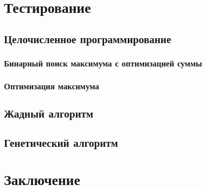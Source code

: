 \documentclass[a4paper,14pt,russian]{article}
\begin{document}
\section{Тестирование}
\subsection{Целочисленное программирование}
\subsubsection{Бинарный поиск максимума с оптимизацией суммы}
\subsubsection{Оптимизация максимума}
\subsection{Жадный алгоритм}
\subsection{Генетический алгоритм}

\section{Заключение}

\pagebreak



\end{document}
